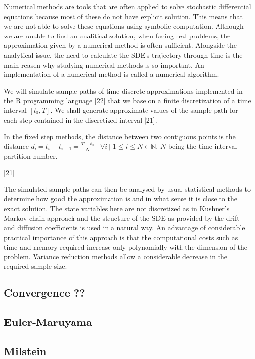 \documentclass[12pt,twoside]{reedthesis}
\theoremstyle{definition}
\theoremstyle{definition}
\theoremstyle{remark}
\begin{document}
  Numerical methods are tools that are often applied to solve stochastic
  differential equations because most of these do not have explicit
  solution. This means that we are not able to solve these equations using
  symbolic computation. Although we are unable to find an analitical
  solution, when facing real problems, the approximation given by a
  numerical method is often sufficient. Alongside the analytical issue,
  the need to calculate the SDE's trajectory through time is the main
  reason why studying numerical methods is so important. An implementation
  of a numerical method is called a numerical algorithm.
  
  We will simulate sample paths of time discrete approximations
  implemented in the R programming language {[}22{]} that we base on a
  finite discretization of a time interval \([t_0, T]\). We shall generate
  approximate values of the sample path for each step contained in the
  discretized interval {[}21{]}.
  
  In the fixed step methods, the distance between two contiguous points is
  the distance
  \(d_i = t_i - t_{i-1} = \frac{T-t_0}{N} \;\;\; \forall i \mid 1 \leq i \leq N \in \mathbb{N}\).
  \(N\) being the time interval partition number.
  
  {[}21{]}
  
  The simulated sample paths can then be analysed by usual statistical
  methods to determine how good the approximation is and in what sense it
  is close to the exact solution. The state variables here are not
  discretized as in Kushner's Markov chain approach and the structure of
  the SDE as provided by the drift and diffusion coefficients is used in a
  natural way. An advantage of considerable practical importance of this
  approach is that the computational costs such as time and memory
  required increase only polynomially with the dimension of the problem.
  Variance reduction methods allow a considerable decrease in the required
  sample size.
  
  \subsection{Convergence ??}\label{convergence}
  
  \subsection{Euler-Maruyama}\label{euler-maruyama}
  
  \subsection{Milstein}\label{milstein}
  
\end{document}
